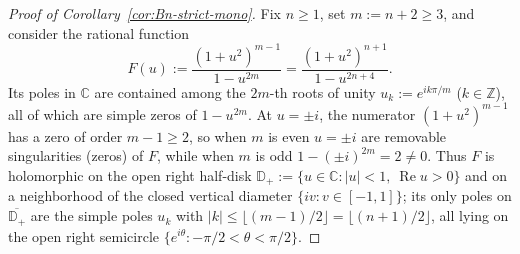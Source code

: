 \documentclass[11pt,a4paper]{article}
\newcommand{\C}{\mathbb{C}}
\newcommand{\D}{\mathbb{D}}
\newcommand{\RePart}{\operatorname{Re}}
\theoremstyle{remark}
\numberwithin{equation}{section}
\begin{document}
\begin{proof}[Proof of Corollary~\ref{cor:Bn-strict-mono}]
Fix $n \ge 1$, set $m := n + 2 \ge 3$, and consider the rational function
\[
    F(u) := \frac{(1 + u^2)^{m-1}}{1 - u^{2m}}
    = \frac{(1 + u^2)^{n+1}}{1 - u^{2n+4}}.
\]
Its poles in $\C$ are contained among the $2m$-th roots of unity $u_k := e^{ik\pi/m}$ ($k \in \mathbb{Z}$), all of which are simple zeros of $1 - u^{2m}$. At $u = \pm i$, the numerator $(1 + u^2)^{m-1}$ has a zero of order $m - 1 \ge 2$, so when $m$ is even $u = \pm i$ are removable singularities (zeros) of $F$, while when $m$ is odd $1 - (\pm i)^{2m} = 2 \neq 0$. Thus $F$ is holomorphic on the open right half-disk $\D_+ := \{u \in \C : |u| < 1,\ \RePart u > 0\}$ and on a neighborhood of the closed vertical diameter $\{iv : v \in [-1,1]\}$; its only poles on $\overline{\D_+}$ are the simple poles $u_k$ with $|k| \le \lfloor(m-1)/2\rfloor = \lfloor(n+1)/2\rfloor$, all lying on the open right semicircle $\{e^{i\theta} : -\pi/2 < \theta < \pi/2\}$.


\end{proof}
\end{document}
